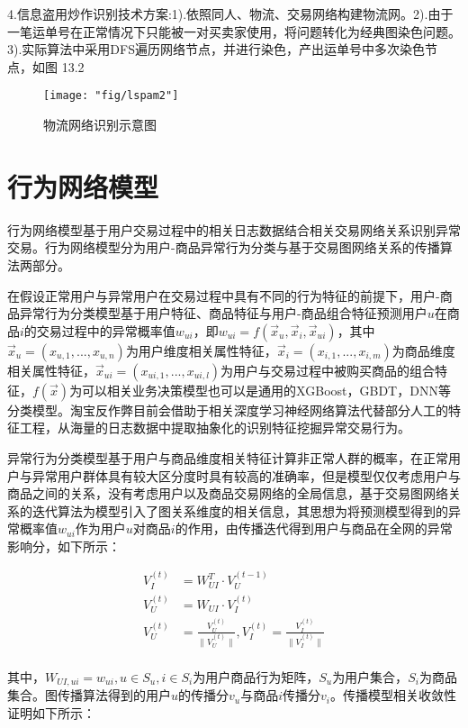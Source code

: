 4.信息盗用炒作识别技术方案:1).依照同人、物流、交易网络构建物流网。2).由于一笔运单号在正常情况下只能被一对买卖家使用，将问题转化为经典图染色问题。3).实际算法中采用DFS遍历网络节点，并进行染色，产出运单号中多次染色节点，如图 13.2

\begin{figure}
	\centering
	\texttt{[image: "fig/lspam2"]}
	\caption{物流网络识别示意图}
	\label{fig:lspam2}
\end{figure}

\section{行为网络模型} 
行为网络模型基于用户交易过程中的相关日志数据结合相关交易网络关系识别异常交易。行为网络模型分为用户-商品异常行为分类与基于交易图网络关系的传播算法两部分。

在假设正常用户与异常用户在交易过程中具有不同的行为特征的前提下，用户-商品异常行为分类模型基于用户特征、商品特征与用户-商品组合特征预测用户$u$在商品$i$的交易过程中的异常概率值$w_{ui}$，即$w_{ui}=f(\vec x_u, \vec x_i, \vec x_{ui})$，其中$\vec x_u=(x_{u,1},...,x_{u,n})$为用户维度相关属性特征，$\vec x_i=(x_{i,1},...,x_{i,m})$为商品维度相关属性特征，$\vec x_{ui}=(x_{ui,1},...,x_{ui,l})$为用户与交易过程中被购买商品的组合特征，$f(\vec x)$为可以相关业务决策模型也可以是通用的XGBoost，GBDT，DNN等分类模型。淘宝反作弊目前会借助于相关深度学习神经网络算法代替部分人工的特征工程，从海量的日志数据中提取抽象化的识别特征挖掘异常交易行为。

异常行为分类模型基于用户与商品维度相关特征计算非正常人群的概率，在正常用户与异常用户群体具有较大区分度时具有较高的准确率，但是模型仅仅考虑用户与商品之间的关系，没有考虑用户以及商品交易网络的全局信息，基于交易图网络关系的迭代算法为模型引入了图关系维度的相关信息，其思想为将预测模型得到的异常概率值$w_{ui}$作为用户$u$对商品$i$的作用，由传播迭代得到用户与商品在全网的异常影响分，如下所示：

\begin{equation}
\begin{aligned}
V_I^{(t)} & = W_{UI}^T \cdot V_U^{(t-1)} \\
V_U^{(t)} & = W_{UI}   \cdot V_I^{(t)} \\
V_U^{(t)} & = \frac{V_U^{(t)}}{\lVert{V_U^{(t)}}\rVert}, V_I^{(t)} = \frac{V_I^{(t)}}{\lVert{V_I^{(t)}}\rVert}\\
\end{aligned}
\end{equation}

其中，$W_{UI,ui}=w_{ui},u \in S_u, i \in S_i$为用户商品行为矩阵，$S_u$为用户集合，$S_i$为商品集合。图传播算法得到的用户$u$的传播分$v_u$与商品$i$传播分$v_i$。传播模型相关收敛性证明如下所示：

